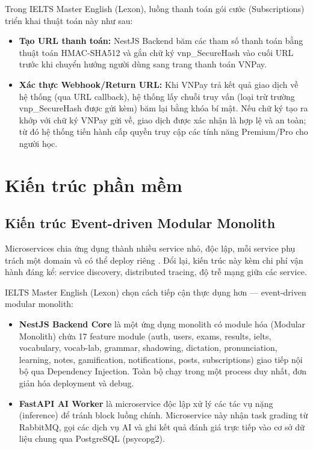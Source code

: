 Trong IELTS Master English (Lexon), luồng thanh toán gói cước (Subscriptions) triển khai thuật toán này như sau:
\begin{itemize}
    \item \textbf{Tạo URL thanh toán:} NestJS Backend băm các tham số thanh toán bằng thuật toán HMAC-SHA512 và gắn chữ ký vnp\_SecureHash vào cuối URL trước khi chuyển hướng người dùng sang trang thanh toán VNPay.
    \item \textbf{Xác thực Webhook/Return URL:} Khi VNPay trả kết quả giao dịch về hệ thống (qua URL callback), hệ thống lấy chuỗi truy vấn (loại trừ trường vnp\_SecureHash được gửi kèm) băm lại bằng khóa bí mật. Nếu chữ ký tạo ra khớp với chữ ký VNPay gửi về, giao dịch được xác nhận là hợp lệ và an toàn; từ đó hệ thống tiến hành cấp quyền truy cập các tính năng Premium/Pro cho người học.
\end{itemize}

\section{Kiến trúc phần mềm}

\subsection{Kiến trúc Event-driven Modular Monolith}

Microservices chia ứng dụng thành nhiều service nhỏ, độc lập, mỗi service phụ trách một domain và có thể deploy riêng \cite{newman2015microservices}. Đổi lại, kiến trúc này kèm chi phí vận hành đáng kể: service discovery, distributed tracing, độ trễ mạng giữa các service.

IELTS Master English (Lexon) chọn cách tiếp cận thực dụng hơn --- event-driven modular monolith:

\begin{itemize}
    \item \textbf{NestJS Backend Core} là một ứng dụng monolith có module hóa (Modular Monolith) chứa 17 feature module (auth, users, exams, results, ielts, vocabulary, vocab-lab, grammar, shadowing, dictation, pronunciation, learning, notes, gamification, notifications, posts, subscriptions) giao tiếp nội bộ qua Dependency Injection. Toàn bộ chạy trong một process duy nhất, đơn giản hóa deployment và debug.
    \item \textbf{FastAPI AI Worker} là microservice độc lập xử lý các tác vụ nặng (inference) để tránh block luồng chính. Microservice này nhận task grading từ RabbitMQ, gọi các dịch vụ AI và ghi kết quả đánh giá trực tiếp vào cơ sở dữ liệu chung qua PostgreSQL (psycopg2).
\end{itemize}

